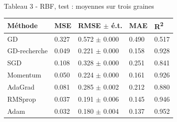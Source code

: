 \documentclass[10pt,a4paper]{article}
\begin{document}
\begin{center}{\footnotesize Tableau 3 - RBF, test : moyennes sur trois graines\par\medskip\begin{tabular}{lllll}\toprule
Méthode & MSE & RMSE $\pm$ é.t. & MAE & R\textsuperscript{2} \\
\midrule
GD & 0.327 & 0.572 $\pm$ 0.000 & 0.490 & 0.517 \\
GD-recherche & 0.049 & 0.221 $\pm$ 0.000 & 0.158 & 0.928 \\
SGD & 0.108 & 0.328 $\pm$ 0.000 & 0.251 & 0.841 \\
Momentum & 0.050 & 0.224 $\pm$ 0.000 & 0.161 & 0.926 \\
AdaGrad & 0.081 & 0.285 $\pm$ 0.002 & 0.212 & 0.880 \\
RMSprop & 0.037 & 0.191 $\pm$ 0.006 & 0.145 & 0.946 \\
Adam & 0.032 & 0.180 $\pm$ 0.004 & 0.137 & 0.952 \\
\bottomrule\end{tabular}}\end{center}
\end{document}
